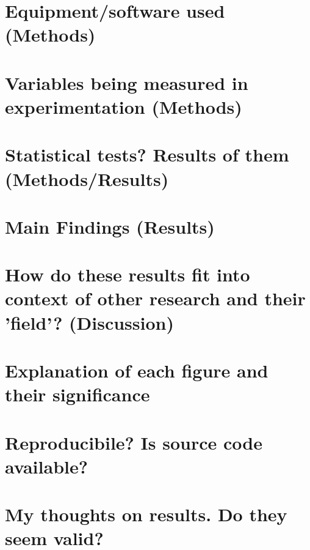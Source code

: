 \documentclass{article}
\begin{document}
\section{Equipment/software used (Methods)}

\section{Variables being measured in experimentation (Methods)}

\section{Statistical tests? Results of them (Methods/Results)}

\section{Main Findings (Results)}

\section{How do these results fit into context of other research and their 'field'? (Discussion)}

\section{Explanation of each figure and their significance}

\section{Reproducibile? Is source code available?}

\section{My thoughts on results. Do they seem valid?}
\end{document}
